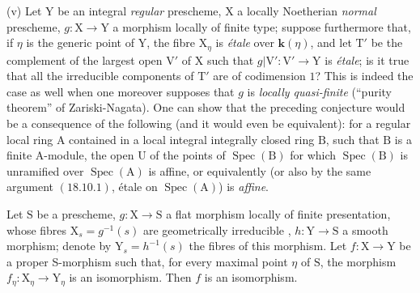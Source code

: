 \begin{remarks}[21.12.14]
(v) Let $\mathrm{Y}$ be an integral \emph{regular} prescheme, $\mathrm{X}$ a locally Noetherian \emph{normal} prescheme, $g:\mathrm{X}\to\mathrm{Y}$ a morphism locally of finite type; suppose furthermore that, if $\eta$ is the generic point of $\mathrm{Y}$, the fibre $\mathrm{X}_\eta$ is \emph{\'etale} over $\boldsymbol{k}(\eta)$, and let $\mathrm{T}'$ be the complement of the largest open $\mathrm{V}'$ of $\mathrm{X}$ such that $g|\mathrm{V}':\mathrm{V}'\to\mathrm{Y}$ is \emph{\'etale}; is it true that all the irreducible components of $\mathrm{T}'$ are of codimension $1$?
This is indeed the case as well when one moreover supposes that $g$ is \emph{locally quasi-finite} (``purity theorem'' of Zariski-Nagata).
One can show that the preceding conjecture would be a consequence of the following (and it would even be equivalent): for a regular local ring $\mathrm{A}$ contained in a local integral integrally closed ring $\mathrm{B}$, such that $\mathrm{B}$ is a finite A-module, the open $\mathrm{U}$ of the points of $\operatorname{Spec}(\mathrm{B})$ for which $\operatorname{Spec}(\mathrm{B})$ is unramified over $\operatorname{Spec}(\mathrm{A})$ is affine, or equivalently (or also by the same argument $(18.10.1)$, \'etale on $\operatorname{Spec}(\mathrm{A})$) is \emph{affine}.
\end{remarks}

\begin{proposition}[21.12.15]
\label{IV.21.12.15}
Let $\mathrm{S}$ be a prescheme, $g:\mathrm{X}\to\mathrm{S}$ a flat morphism locally of finite presentation, whose fibres $\mathrm{X}_s=g^{-1}(s)$ are geometrically irreducible , $h:\mathrm{Y}\to\mathrm{S}$ a smooth morphism; denote by $\mathrm{Y}_s=h^{-1}(s)$ the fibres of this morphism.
Let $f:\mathrm{X}\to\mathrm{Y}$ be a proper S-morphism such that, for every maximal point $\eta$ of $\mathrm{S}$, the morphism $f_\eta:\mathrm{X}_\eta\to\mathrm{Y}_\eta$ is an isomorphism.
Then $f$ is an isomorphism.
\end{proposition}

